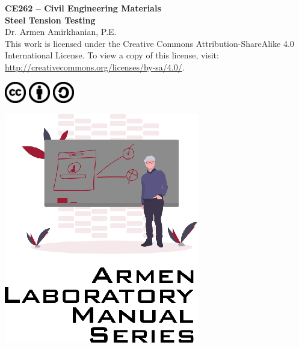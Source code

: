 \documentclass[12pt]{article}
\newcommand{\CourseNum}{CE262}
\newcommand{\CourseName}{Civil Engineering Materials}
\newcommand{\LabTitle}{Steel Tension Testing}
\begin{document}
\begin{titlepage}
\begin{flushright}
\LARGE{\textbf{\CourseNum{} -- \CourseName}}\\
\vfill
\Huge{\textbf{\LabTitle}}\\
    \vfill
    \large Dr. Armen Amirkhanian, P.E.\\
\vfill
\normalsize This work is licensed under the Creative Commons Attribution-ShareAlike 4.0 International License. To view a copy of this license, visit:
\href{http://creativecommons.org/licenses/by-sa/4.0/}{http://creativecommons.org/licenses/by-sa/4.0/}.

\includegraphics[width=0.07\textwidth]{cc.eps}
\includegraphics[width=0.07\textwidth]{by.eps}
\includegraphics[width=0.07\textwidth]{sa.eps}
\vfill

\includegraphics[width=0.3\linewidth]{Logo.eps}\\ 
 
  
\end{flushright}
\end{titlepage}
\end{document}
